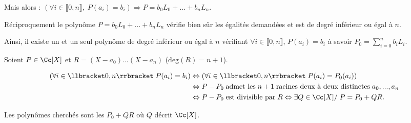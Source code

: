 {{\begin{center}
\end{center}

Mais alors : $(\forall i\in\llbracket0,n\rrbracket,\;P(a_i)=b_i)\Rightarrow P=b_0L_0 + ... + b_nL_n$.

 
Réciproquement le polynôme $P= b_0L_0+ ... +b_nL_n$ vérifie bien sûr les égalités demandées et est de degré inférieur ou égal à $n$.

Ainsi, il existe un et un seul polynôme de degré inférieur ou égal à $n$ vérifiant $\forall i\in\llbracket0,n\rrbracket$, $P(a_i)=b_i$ à savoir $P_0=\sum_{i=0}^{n}b_iL_i$.

Soient $P\in\Cc[X]$ et $R=(X-a_0) ... (X-a_n)$ ($\text{deg}(R)=n+1$).

\begin{align*}\ensuremath
(\forall i\in\llbracket0,n\rrbracket\;P(a_i) = b_i)&\Leftrightarrow(\forall i\in\llbracket0,n\rrbracket\;P(a_i)=P_0(a_i))\\
 &\Leftrightarrow P-P_0\;\text{admet les}\;n+1\;\text{racines deux à deux distinctes}\;a_0,...,a_n\\
  &\Leftrightarrow P-P_0\;\text{est divisible par}\;R\Leftrightarrow\exists Q\in\Cc[X]/\;P= P_0+QR.
\end{align*}

Les polynômes cherchés sont les $P_0+QR$ où $Q$ décrit $\Cc[X]$.
}
}
